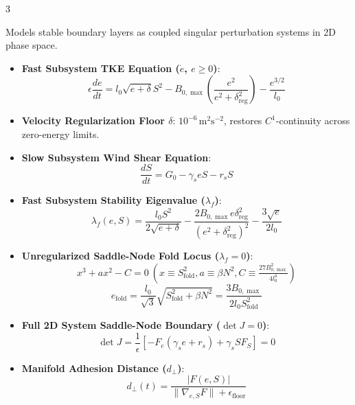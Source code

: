 \documentclass[9pt,landscape,letterpaper]{article}
\begin{document}
\begin{multicols}{3}
\begin{tcolorbox}[cheatsheetbox, title=2. 2D Fast-Slow SBL Dynamical System]
Models stable boundary layers as coupled singular perturbation systems in 2D phase space.
\begin{itemize}
    \item \textbf{Fast Subsystem TKE Equation ($\dot{e}$, $e \ge 0$)}:
    $$\epsilon \frac{de}{dt} = l_0 \sqrt{e + \delta} S^2 - B_{0,\max}\left(\frac{e^2}{e^2 + \delta_{\text{reg}}^2}\right) - \frac{e^{3/2}}{l_0}$$
    \item \textbf{Velocity Regularization Floor $\delta$}: $10^{-6}\,\text{m}^2\text{s}^{-2}$, restores $C^1$-continuity across zero-energy limits.
    \item \textbf{Slow Subsystem Wind Shear Equation}:
    $$\frac{dS}{dt} = G_0 - \gamma_s e S - r_s S$$
    \item \textbf{Fast Subsystem Stability Eigenvalue ($\lambda_f$)}:
    $$\lambda_f(e, S) = \frac{l_0 S^2}{2\sqrt{e+\delta}} - \frac{2 B_{0,\max} e \delta_{\text{reg}}^2}{(e^2 + \delta_{\text{reg}}^2)^2} - \frac{3\sqrt{e}}{2l_0}$$
    \item \textbf{Unregularized Saddle-Node Fold Locus ($\lambda_f = 0$)}:
    $$x^3 + a x^2 - C = 0 \ \left(x \equiv S_{\text{fold}}^2, a \equiv \beta N^2, C \equiv \tfrac{27 B_{0,\max}^2}{4l_0^4}\right)$$
    $$e_{\text{fold}} = \frac{l_0}{\sqrt{3}}\sqrt{S_{\text{fold}}^2 + \beta N^2} = \frac{3 B_{0,\max}}{2 l_0 S_{\text{fold}}^2}$$
    \item \textbf{Full 2D System Saddle-Node Boundary ($\det J = 0$)}:
    $$\det J = \frac{1}{\epsilon} \left[ -F_e(\gamma_s e + r_s) + \gamma_s S F_S \right] = 0$$
    \item \textbf{Manifold Adhesion Distance ($d_\perp$)}:
    $$d_\perp(t) = \frac{|F(e,S)|}{\|\nabla_{e,S} F\| + \epsilon_{\text{floor}}}$$
\end{itemize}
\end{tcolorbox}
\columnbreak


\end{multicols}
\end{document}
